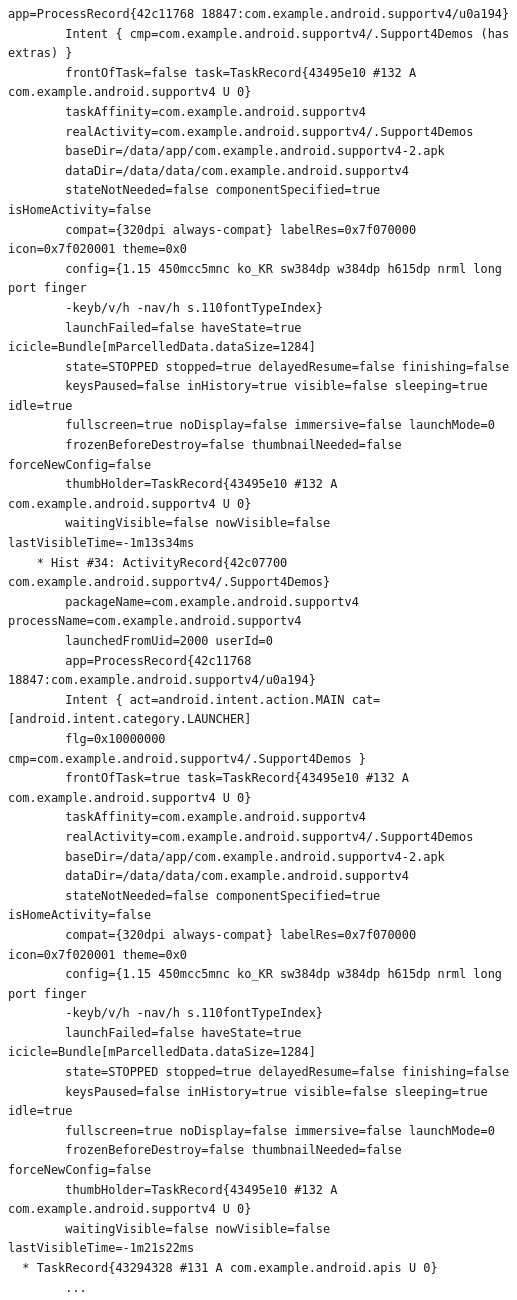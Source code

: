 \begin{lstlisting}[frame=single]
        app=ProcessRecord{42c11768 18847:com.example.android.supportv4/u0a194}
        Intent { cmp=com.example.android.supportv4/.Support4Demos (has extras) }
        frontOfTask=false task=TaskRecord{43495e10 #132 A com.example.android.supportv4 U 0}
        taskAffinity=com.example.android.supportv4
        realActivity=com.example.android.supportv4/.Support4Demos
        baseDir=/data/app/com.example.android.supportv4-2.apk
        dataDir=/data/data/com.example.android.supportv4
        stateNotNeeded=false componentSpecified=true isHomeActivity=false
        compat={320dpi always-compat} labelRes=0x7f070000 icon=0x7f020001 theme=0x0
        config={1.15 450mcc5mnc ko_KR sw384dp w384dp h615dp nrml long port finger 
        -keyb/v/h -nav/h s.110fontTypeIndex}
        launchFailed=false haveState=true icicle=Bundle[mParcelledData.dataSize=1284]
        state=STOPPED stopped=true delayedResume=false finishing=false
        keysPaused=false inHistory=true visible=false sleeping=true idle=true
        fullscreen=true noDisplay=false immersive=false launchMode=0
        frozenBeforeDestroy=false thumbnailNeeded=false forceNewConfig=false
        thumbHolder=TaskRecord{43495e10 #132 A com.example.android.supportv4 U 0}
        waitingVisible=false nowVisible=false lastVisibleTime=-1m13s34ms
    * Hist #34: ActivityRecord{42c07700 com.example.android.supportv4/.Support4Demos}
        packageName=com.example.android.supportv4 processName=com.example.android.supportv4
        launchedFromUid=2000 userId=0
        app=ProcessRecord{42c11768 18847:com.example.android.supportv4/u0a194}
        Intent { act=android.intent.action.MAIN cat=[android.intent.category.LAUNCHER] 
        flg=0x10000000 cmp=com.example.android.supportv4/.Support4Demos }
        frontOfTask=true task=TaskRecord{43495e10 #132 A com.example.android.supportv4 U 0}
        taskAffinity=com.example.android.supportv4
        realActivity=com.example.android.supportv4/.Support4Demos
        baseDir=/data/app/com.example.android.supportv4-2.apk
        dataDir=/data/data/com.example.android.supportv4
        stateNotNeeded=false componentSpecified=true isHomeActivity=false
        compat={320dpi always-compat} labelRes=0x7f070000 icon=0x7f020001 theme=0x0
        config={1.15 450mcc5mnc ko_KR sw384dp w384dp h615dp nrml long port finger 
        -keyb/v/h -nav/h s.110fontTypeIndex}
        launchFailed=false haveState=true icicle=Bundle[mParcelledData.dataSize=1284]
        state=STOPPED stopped=true delayedResume=false finishing=false
        keysPaused=false inHistory=true visible=false sleeping=true idle=true
        fullscreen=true noDisplay=false immersive=false launchMode=0
        frozenBeforeDestroy=false thumbnailNeeded=false forceNewConfig=false
        thumbHolder=TaskRecord{43495e10 #132 A com.example.android.supportv4 U 0}
        waitingVisible=false nowVisible=false lastVisibleTime=-1m21s22ms
  * TaskRecord{43294328 #131 A com.example.android.apis U 0}
        ...
        

\end{lstlisting}
